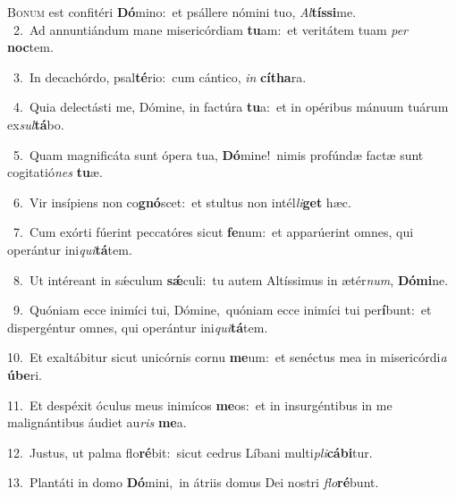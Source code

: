 \lettrine{\initial\textcolor{\initialcolor}{B}}{onum} est confitéri \textbf{Dó}\-mino:~\star et psállere nómini tuo, \textit{Al}\-\textbf{tís}\textbf{si}me.\\
{\numbfont\textcolor{\numbcolor}{~2.}}~Ad annuntiándum mane misericórdiam \textbf{tu}\-am:~\star et veritátem tuam \textit{per} \textbf{noc}\-tem.\par
{\numbfont\textcolor{\numbcolor}{~3.}}~In decachórdo, psal\-\textbf{té}\-rio:~\star cum cántico, \textit{in} \textbf{cí}\-\textbf{tha}ra.\par
{\numbfont\textcolor{\numbcolor}{~4.}}~Quia delectásti me, Dómine, in factúra \textbf{tu}\-a:~\star et in opéribus mánuum tuárum ex\-\textit{sul}\-\textbf{tá}bo.\par
{\numbfont\textcolor{\numbcolor}{~5.}}~Quam magnificáta sunt ópera tua, \textbf{Dó}\-mine!~\star nimis profúndæ factæ sunt cogitatió\textit{nes} \textbf{tu}\-æ.\par
{\numbfont\textcolor{\numbcolor}{~6.}}~Vir insípiens non co\-\textbf{gnó}\-scet:~\star et stultus non intél\-\textit{li}\-\textbf{get} hæc.\par
{\numbfont\textcolor{\numbcolor}{~7.}}~Cum exórti fúerint peccatóres sicut \textbf{fe}\-num:~\star et apparúerint omnes, qui operántur ini\-\textit{qui}\-\textbf{tá}tem.\par
{\numbfont\textcolor{\numbcolor}{~8.}}~Ut intéreant in sǽculum \textbf{sǽ}\-culi:~\star tu autem Altíssimus in ætér\-\textit{num}\-, \textbf{Dó}\-\textbf{mi}ne.\par
{\numbfont\textcolor{\numbcolor}{~9.}}~Quóniam ecce inimíci tui, Dómine,~\dagger quóniam ecce inimíci tui per\-\textbf{í}\-bunt:~\star et dispergéntur omnes, qui operántur ini\-\textit{qui}\-\textbf{tá}tem.\par
{\numbfont\textcolor{\numbcolor}{10.}}~Et exaltábitur sicut unicórnis cornu \textbf{me}\-um:~\star et senéctus mea in misericórdi\textit{a} \textbf{ú}\-\textbf{be}ri.\par
{\numbfont\textcolor{\numbcolor}{11.}}~Et despéxit óculus meus inimícos \textbf{me}\-os:~\star et in insurgéntibus in me malignántibus áudiet au\textit{ris} \textbf{me}\-a.\par
{\numbfont\textcolor{\numbcolor}{12.}}~Justus, ut palma flo\-\textbf{ré}\-bit:~\star sicut cedrus Líbani multi\-\textit{pli}\-\textbf{cá}\textbf{bi}tur.\par
{\numbfont\textcolor{\numbcolor}{13.}}~Plantáti in domo \textbf{Dó}\-mini,~\star in átriis domus Dei nostri \textit{flo}\-\textbf{ré}bunt.\par
